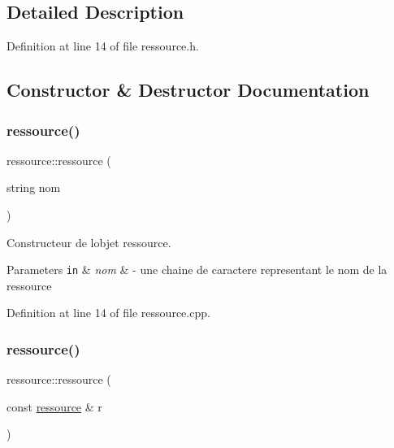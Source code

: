 \subsection{Detailed Description}


Definition at line 14 of file ressource.\+h.



\subsection{Constructor \& Destructor Documentation}
\hypertarget{classressource_a261f4c729d03d562e1d35187999ce4ef}{}\label{classressource_a261f4c729d03d562e1d35187999ce4ef} 
\subsubsection{\texorpdfstring{ressource()}{ressource()}\hspace{0.1cm}{\footnotesize\ttfamily [1/2]}}
{\footnotesize\ttfamily ressource\+::ressource (\begin{DoxyParamCaption}\item[{string}]{nom }\end{DoxyParamCaption})}



Constructeur de l\textquotesingle{}objet ressource. 


\begin{DoxyParams}[1]{Parameters}
\mbox{\tt in}  & {\em nom} & -\/ une chaine de caractere representant le nom de la ressource \\
\hline
\end{DoxyParams}


Definition at line 14 of file ressource.\+cpp.

\hypertarget{classressource_adccfe979d5ccf07ae4f0cfa944e9f1b0}{}\label{classressource_adccfe979d5ccf07ae4f0cfa944e9f1b0} 
\subsubsection{\texorpdfstring{ressource()}{ressource()}\hspace{0.1cm}{\footnotesize\ttfamily [2/2]}}
{\footnotesize\ttfamily ressource\+::ressource (\begin{DoxyParamCaption}\item[{const \hyperlink{classressource}{ressource} \&}]{r }\end{DoxyParamCaption})\hspace{0.3cm}{\ttfamily [default]}}



